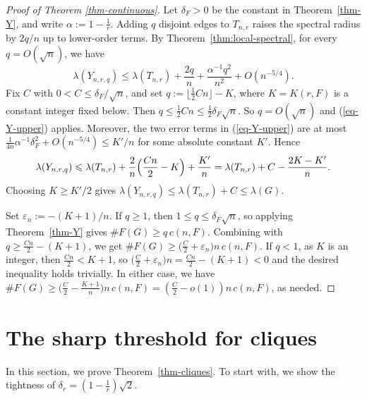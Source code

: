 \documentclass[11pt,a4paper]{article}
\theoremstyle{definition}
\theoremstyle{plain}
\newcommand{\eps}{\varepsilon}
\renewcommand{\le}{\leqslant}
\renewcommand{\ge}{\geqslant}
\begin{document}
\begin{proof}[Proof of Theorem \ref{thm-continuous}]
Let $\delta_F>0$ be the constant 
in Theorem~\ref{thm-Y}, and write 
$\alpha:=1-\tfrac1r$. Adding $q$ disjoint edges to 
$T_{n,r}$ raises the spectral radius by $2q/n$ up to 
lower-order terms. By Theorem~\ref{thm:local-spectral}, for every
$q=O(\sqrt n)$, we have 
\begin{equation} \label{eq-Y-upper}
    \lambda(Y_{n,r,q})
    \le \lambda(T_{n,r})+\frac{2q}{n}
        +\frac{\alpha^{-1}q^2}{n^2}+O(n^{-5/4}).
\end{equation} 
Fix $C$ with $0<C\le\delta_F/\sqrt n$, and set
$q:=\lfloor \frac{1}{2}Cn\rfloor-K$, where $K=K(r,F)$ is a constant integer 
fixed below. Then
$  q\le\frac{1}{2}Cn \le\frac{1}{2} \delta_F\sqrt n$. 
So $q=O(\sqrt n)$ and (\ref{eq-Y-upper}) applies. Moreover, the two
error terms in (\ref{eq-Y-upper}) are at most
$\frac{1}{4n} \alpha^{-1}\delta_F^2 +O(n^{-5/4})\le K'/n$ for
some absolute constant $K'$. Hence
\[
    \lambda(Y_{n,r,q})
    \le\lambda(T_{n,r})
       +\frac{2}{n}\Bigl(\frac{Cn}{2}-K\Bigr)+\frac{K'}{n}
    =\lambda(T_{n,r})+C-\frac{2K-K'}{n}.
\]
Choosing $K\ge K'/2$ gives
$\lambda(Y_{n,r,q})\le\lambda(T_{n,r})+C\le\lambda(G)$.

Set $\eps_n:=-(K+1)/n$. If $q\ge1$, then
$1\le q\le\delta_F\sqrt n$, so applying Theorem~\ref{thm-Y}
gives $\texttt{\#}F(G)\ge q\,c(n,F)$. Combining with 
$q\ge\frac{Cn}{2}-(K+1)$, we get 
$ \texttt{\#}F(G)\ge \big(\frac{C}{2}+\eps_n\big)
        n\,c(n,F)$.  
If $q<1$, as $K$ is an integer, then $\frac{Cn}{2}<K+1$, so
$\bigl(\frac C2+\eps_n\bigr)n=\frac{Cn}{2}-(K+1)<0$ and the desired 
inequality holds trivially. In either case, we have 
$\texttt{\#}F(G)\ge\bigl(\frac C2 - \frac{K+1}{n}\bigr)n\,c(n,F)=(\frac{C}{2} - o(1))n\, c(n,F)$, as needed. 
\end{proof} 
 





\section{The sharp threshold for cliques} 

\label{sec:clique} 

In this section, we prove Theorem~\ref{thm-cliques}. 
To start with, we show the tightness of $\delta_r= (1-\frac{1}{r})\sqrt{2}$.  

\end{document}
